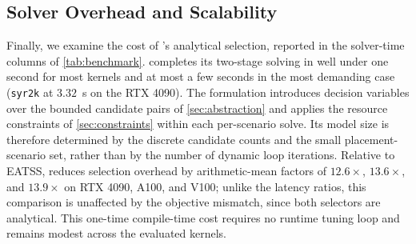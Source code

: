 \subsection{Solver Overhead and Scalability}
\label{subsec:overhead}

Finally, we examine the cost of \name's analytical selection, reported in the solver-time columns of \autoref{tab:benchmark}.  \name completes its two-stage solving in well under one second for most kernels and at most a few seconds in the most demanding case (\texttt{syr2k} at $3.32$~s on the RTX 4090). The formulation introduces decision variables over the bounded candidate pairs of \autoref{sec:abstraction} and applies the resource constraints of \autoref{sec:constraints} within each per-scenario solve. Its model size is therefore determined by the discrete candidate counts and the small placement-scenario set, rather than by the number of dynamic loop iterations. Relative to EATSS, \name reduces selection overhead by arithmetic-mean factors of $12.6\times$, $13.6\times$, and $13.9\times$ on RTX 4090, A100, and V100; unlike the latency ratios, this comparison is unaffected by the objective mismatch, since both selectors are analytical. This one-time compile-time cost requires no runtime tuning loop and remains modest across the evaluated kernels.


